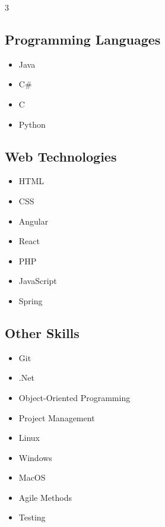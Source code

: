 \documentclass[11pt,a4paper,sans]{moderncv}
\begin{document}
\begin{multicols}{3}

\subsection*{Programming Languages}
\begin{itemize}[label={\textbullet}, itemsep=0pt]
    \item Java
    \item C\#
    \item C
    \item Python
 
\end{itemize}

\subsection*{Web Technologies}
\begin{itemize}[label={\textbullet}, itemsep=0pt]
    \item HTML
    \item CSS
    \item Angular   
    \item React
    \item PHP
    \item JavaScript
    \item Spring
\end{itemize}

\subsection*{Other Skills}
\begin{itemize}[label={\textbullet}, itemsep=0pt]
    \item Git
    \item .Net
    \item Object-Oriented Programming
    \item Project Management
    \item Linux
    \item Windows
    \item MacOS
    \item Agile Methods
    \item Testing
\end{itemize}

\end{multicols}
\end{document}
